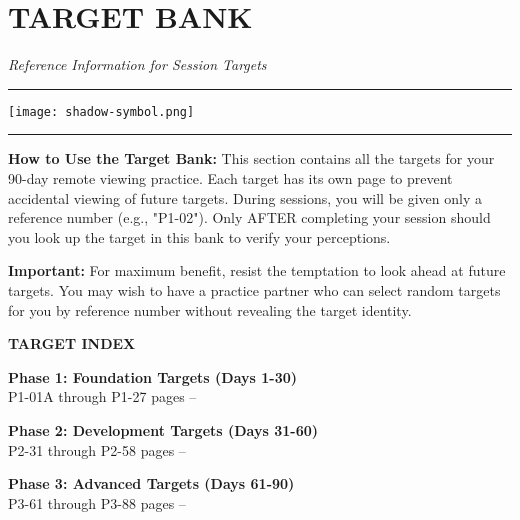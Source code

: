 \documentclass[10pt,twoside,final]{book} %
\newcommand{\themesymbol}{%
  \texttt{[image: shadow-symbol.png]}%
}
\newcommand{\elegantdivider}{%
  \begin{center}
    \textcolor{rvprimary}{\rule{0.3\textwidth}{0.7pt}}%
    \themesymbol%
    \textcolor{rvprimary}{\rule{0.3\textwidth}{0.7pt}}%
  \end{center}
}
\begin{document}
\chapter*{TARGET BANK}
\thispagestyle{fancy}
\begin{center}
\Large\itshape Reference Information for Session Targets
\vspace{0.2cm}
\elegantdivider
\end{center}

\begin{mdframed}[backgroundcolor=rvlight, linewidth=0.7pt, linecolor=rvprimary, shadow=true, shadowsize=1pt, shadowcolor=graydark!40, roundcorner=3pt, innertopmargin=10pt, innerbottommargin=10pt]
\textbf{How to Use the Target Bank:} This section contains all the targets for your 90-day remote viewing practice. Each target has its own page to prevent accidental viewing of future targets. During sessions, you will be given only a reference number (e.g., "P1-02"). Only AFTER completing your session should you look up the target in this bank to verify your perceptions.

\textbf{Important:} For maximum benefit, resist the temptation to look ahead at future targets. You may wish to have a practice partner who can select random targets for you by reference number without revealing the target identity.
\end{mdframed}

\vspace{0.5cm}
\begin{center}
\begin{mdframed}[backgroundcolor=white, linewidth=0.7pt, linecolor=rvprimary, shadow=true, shadowsize=1pt, shadowcolor=graydark!40, roundcorner=3pt]
\begin{center}
\large\textbf{TARGET INDEX}
\end{center}

\textbf{Phase 1: Foundation Targets (Days 1-30)}\\
P1-01A through P1-27 \hfill pages \pageref{target:P1-01A}--\pageref{target:P1-27}

\textbf{Phase 2: Development Targets (Days 31-60)}\\
P2-31 through P2-58 \hfill pages \pageref{target:P2-31}--\pageref{target:P2-58}

\textbf{Phase 3: Advanced Targets (Days 61-90)}\\
P3-61 through P3-88 \hfill pages \pageref{target:P3-61}--\pageref{target:P3-88}
\end{mdframed}
\end{center}
\end{document}
